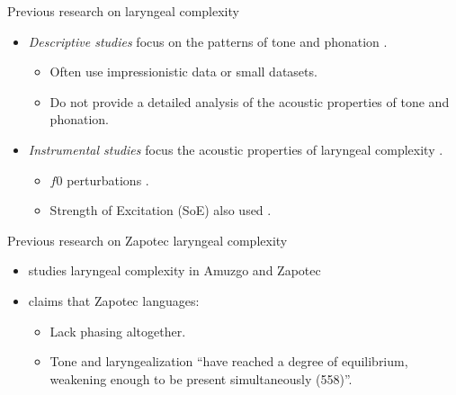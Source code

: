 \documentclass[professionalfonts]{beamer}
\begin{document}
\begin{frame}{Previous research on laryngeal complexity}
  \begin{itemize}
    \item \textit{Descriptive studies} focus on the patterns of tone and phonation \citep[e.g.,][]{ariza-garciaPhonationTypesTones2018,frazierPhoneticsYucatecMaya2013,pickettIsthmusJuchitanZapotec2010}.
      \begin{itemize}
        \item Often use impressionistic data or small datasets.
        \item Do not provide a detailed analysis of the acoustic properties of tone and phonation.
      \end{itemize}
    \item \textit{Instrumental studies} focus the acoustic properties of laryngeal complexity \citep[e.g.,][]{dicanioCoarticulationToneGlottal2012,garellekAcousticConsequencesPhonation2011,keltererPhonationTypeContrasts2020}.
    \begin{itemize}
      \item $f0$ perturbations \citep[e.g.,][]{dicanioCoarticulationToneGlottal2012}.
      \item Strength of Excitation (SoE) also used \citep{wellerInteractionsToneGlottalization2023,wellerLexicalToneVowel2023,wellerVoiceQualityTone2024}.
    \end{itemize}
  \end{itemize}
\end{frame}

\begin{frame}{Previous research on Zapotec laryngeal complexity}
  \begin{itemize}
    \item \citet{herrerazendejasAmuzgoZapotecTwo2000} studies laryngeal complexity in Amuzgo and Zapotec
    \item \citet{herrerazendejasAmuzgoZapotecTwo2000} claims that Zapotec languages:
      \begin{itemize}
        \item Lack phasing altogether.
        \item Tone and laryngealization ``have reached a degree of equilibrium, weakening enough to be present simultaneously (558)''.
      \end{itemize}
  \end{itemize}
\end{frame}

\end{document}
